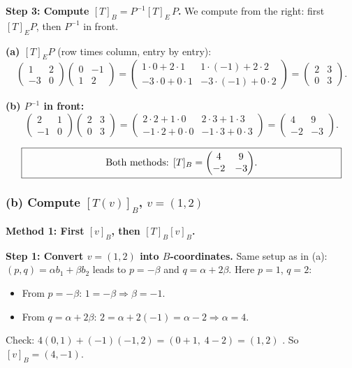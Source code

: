 \documentclass[a4paper,12pt]{article}
\begin{document}
\textbf{Step 3: Compute $[T]_B = P^{-1} [T]_E\, P$.} We compute from the right: first $[T]_E P$, then $P^{-1}$ in front.

\textbf{(a) $[T]_E P$} (row times column, entry by entry):
\[
\begin{pmatrix} 1 & 2 \\ -3 & 0 \end{pmatrix}\begin{pmatrix} 0 & -1 \\ 1 & 2 \end{pmatrix}
= \begin{pmatrix} 1\cdot 0 + 2\cdot 1 & 1\cdot(-1) + 2\cdot 2 \\ -3\cdot 0 + 0\cdot 1 & -3\cdot(-1) + 0\cdot 2 \end{pmatrix}
= \begin{pmatrix} 2 & 3 \\ 0 & 3 \end{pmatrix}.
\]

\textbf{(b) $P^{-1}$ in front:}
\[
\begin{pmatrix} 2 & 1 \\ -1 & 0 \end{pmatrix}\begin{pmatrix} 2 & 3 \\ 0 & 3 \end{pmatrix}
= \begin{pmatrix} 2\cdot 2 + 1\cdot 0 & 2\cdot 3 + 1\cdot 3 \\ -1\cdot 2 + 0\cdot 0 & -1\cdot 3 + 0\cdot 3 \end{pmatrix}
= \begin{pmatrix} 4 & 9 \\ -2 & -3 \end{pmatrix}.
\]

\[
\fbox{\parbox{0.93\textwidth}{\centering
Both methods: $[T]_B = \begin{pmatrix} 4 & 9 \\ -2 & -3 \end{pmatrix}$.
}}
\]

\subsubsection*{(b) Compute $[T(v)]_B$, $v = (1, 2)$}

\textbf{Method 1: First $[v]_B$, then $[T]_B [v]_B$.}

\textbf{Step 1: Convert $v = (1,2)$ into $B$-coordinates.} Same setup as in (a): $(p,q) = \alpha b_1 + \beta b_2$ leads to $p = -\beta$ and $q = \alpha + 2\beta$. Here $p = 1$, $q = 2$:
\begin{itemize}[leftmargin=*, nosep]
    \item From $p = -\beta$: \; $1 = -\beta \Rightarrow \beta = -1$.
    \item From $q = \alpha + 2\beta$: \; $2 = \alpha + 2(-1) = \alpha - 2 \Rightarrow \alpha = 4$.
\end{itemize}
Check: $4(0,1) + (-1)(-1,2) = (0+1,\; 4-2) = (1, 2)$ \checkmark. \quad So $[v]_B = (4, -1)$.
\end{document}
